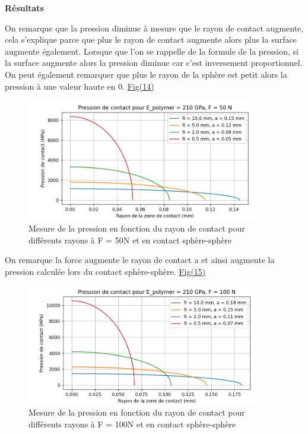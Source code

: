 \documentclass[a4paper,12pt]{article}
\begin{document}
\begin{center}
	\textbf{Résultats}
\end{center}
On remarque que la pression diminue à mesure que le rayon de contact augmente, cela s'explique parce que plus le rayon de contact augmente alors plus la surface augmente également. Lorsque que l'on se rappelle de la formule de la pression, si la surface augmente alors la pression diminue car c'est inversement proportionnel.\\
On peut également remarquer que plus le rayon de la sphère est petit alors la pression à une valeur haute en 0. \hyperref[fig:mon_image14]{Fig(14)}
\begin{figure}[H] 
	\centering
	\includegraphics[width=0.9\textwidth]{pre.png} 
	\caption{Mesure de la pression en fonction du rayon de contact pour différents rayons à F = 50N et en contact sphère-sphère} 
	\label{fig:mon_image14} 
\end{figure}
\clearpage
On remarque la force augmente le rayon de contact a et ainsi augmente la pression calculée lors du contact sphère-sphère. \hyperref[fig:mon_image15]{Fig(15)}
\begin{figure}[H] 
	\centering
	\includegraphics[width=0.9\textwidth]{pre2.png} 
	\caption{Mesure de la pression en fonction du rayon de contact pour différents rayons à F = 100N et en contact sphère-sphère} 
	\label{fig:mon_image15} 
\end{figure}
\end{document}
